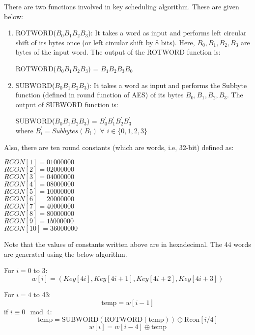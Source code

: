 \documentclass[11pt]{article}
\begin{document}
There are two functions involved in key scheduling algorithm. These are given below:
\begin{enumerate}
    \item ROTWORD($B_0B_1B_2B_3$): It takes a word as input and performs left circular shift of its bytes once (or left circular shift by 8 bits). Here, $B_0, B_1, B_2, B_3$ are bytes of the input word. The output of the ROTWORD function is:
    \begin{center}
        ROTWORD($B_0B_1B_2B_3$) = $B_1B_2B_3B_0$
    \end{center}

    \item SUBWORD($B_0B_1B_2B_3$): It takes a word as input and performs the Subbyte function (defined in round function of AES) of its bytes $B_0, B_1, B_2, B_3$. The output of SUBWORD function is:
    \begin{center}
        SUBWORD($B_0B_1B_2B_3$) = $B_0^{'} B_1^{'} B_2^{'} B_3^{'}$\\
        where $B_i^{'} = Subbytes(B_i)$ $\forall$ $i \in \{0,1,2,3\}$
    \end{center}
\end{enumerate}
Also, there are ten round constants (which are words, i.e, 32-bit) defined as:
\begin{center}
    $RCON[1] = 01000000$\\
    $RCON[2] = 02000000$\\
    $RCON[3] = 04000000$\\
    $RCON[4] = 08000000$\\
    $RCON[5] = 10000000$\\
    $RCON[6] = 20000000$\\
    $RCON[7] = 40000000$\\
    $RCON[8] = 80000000$\\
    $RCON[9] = 1b000000$\\
    $RCON[10] = 36000000$\\
\end{center}
Note that the values of constants written above are in hexadecimal. The 44 words are generated using the below algorithm.

For \( i = 0 \) to 3:
\[
w[i] = (Key[4i], Key[4i + 1], Key[4i + 2], Key[4i + 3])
\]

For \( i = 4 \) to 43:
\[
\text{temp} = w[i - 1]
\]
if \( i \equiv 0 \mod 4 \):
\[
\text{temp} = \text{SUBWORD}(\text{ROTWORD}(\text{temp})) \oplus \text{Rcon}[i/4]
\]
\[
w[i] = w[i - 4] \oplus \text{temp}
\]
\end{document}
